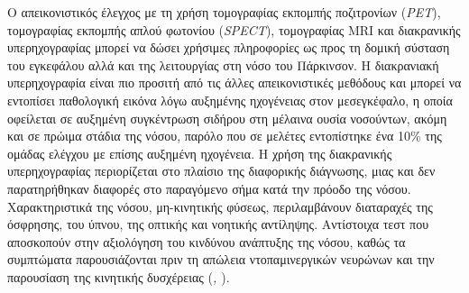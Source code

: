 \documentclass[12pt]{report}
\begin{document}
        \par
        Ο απεικονιστικός έλεγχος με τη χρήση τομογραφίας εκπομπής ποζιτρονίων (\emph{PET}), τομογραφίας εκπομπής απλού φωτονίου (\emph{SPECT}), τομογραφίας MRI και διακρανικής υπερηχογραφίας μπορεί να δώσει χρήσιμες πληροφορίες ως προς τη δομική σύσταση του εγκεφάλου αλλά και της λειτουργίας στη νόσο του Πάρκινσον. Η διακρανιακή υπερηχογραφία είναι πιο προσιτή από τις άλλες απεικονιστικές μεθόδους και μπορεί να εντοπίσει παθολογική εικόνα λόγω αυξημένης ηχογένειας στον μεσεγκέφαλο, η οποία οφείλεται σε αυξημένη συγκέντρωση σιδήρου στη μέλαινα ουσία νοσούντων, ακόμη και σε πρώιμα στάδια της νόσου, παρόλο που σε μελέτες εντοπίστηκε ένα 10\% της ομάδας ελέγχου με επίσης αυξημένη ηχογένεια. Η χρήση της διακρανικής υπερηχογραφίας περιορίζεται στο πλαίσιο της διαφορικής διάγνωσης, μιας και δεν παρατηρήθηκαν διαφορές στο παραγόμενο σήμα κατά την πρόοδο της νόσου. Χαρακτηριστικά της νόσου, μη-κινητικής φύσεως, περιλαμβάνουν διαταραχές της όσφρησης, του ύπνου, της οπτικής και νοητικής αντίληψης. Αντίστοιχα τεστ που αποσκοπούν στην αξιολόγηση του κινδύνου ανάπτυξης της νόσου, καθώς τα συμπτώματα παρουσιάζονται πριν τη απώλεια ντοπαμινεργικών νευρώνων και την παρουσίαση της κινητικής δυσχέρειας (\emph{\cite{Miller2015BiomarkersFuture}, \cite{Zarkali2024NeuroimagingInterventions}}).  
        
\end{document}
